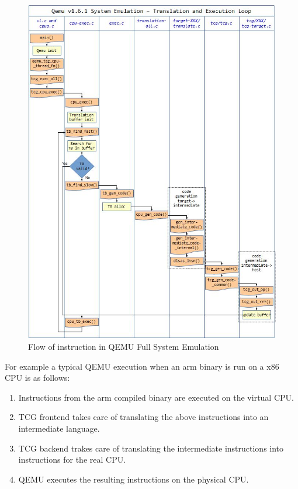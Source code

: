 \begin{figure}[htp]
\centering
\includegraphics[width=\linewidth]{images/qemutcg.jpg}
\caption{Flow of instruction in QEMU Full System Emulation}
\label{fig:qemuflow}
\end{figure}

For example a typical QEMU execution when an arm binary is run on a x86 CPU is as follows: 
\begin{enumerate}
    \item Instructions from the arm compiled binary are executed on the virtual CPU.
    \item TCG frontend takes care of translating the above instructions into an intermediate language. 
    \item TCG backend trakes care of translating the intermediate instructions into instructions for the real CPU. 
    \item QEMU executes the resulting instructions on the physical CPU. 
\end{enumerate}

